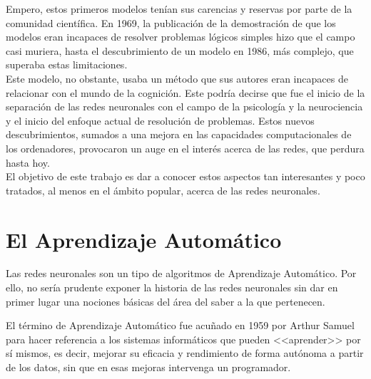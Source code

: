 \documentclass[11pt,twoside,titlepage,a4paper]{article}
\newcommand{\margenimagen}{
\newgeometry{
    left=2.5cm, %
	right=5cm, %
	bottom=2.5cm %
}
}
\numberwithin{equation}{section} %
\theoremstyle{usual}
\begin{document}
Empero, estos primeros modelos tenían sus carencias y reservas por parte
de la comunidad científica. En 1969, la publicación de la demostración de que
los modelos eran incapaces de resolver problemas lógicos simples hizo que el
campo casi muriera, hasta el descubrimiento de un modelo en 1986, más complejo,
que superaba estas limitaciones.\\

Este modelo, no obstante, usaba un método que sus autores eran incapaces de
relacionar con el mundo de la cognición. Este podría decirse que fue el
inicio de la separación de las redes neuronales con el campo de la psicología
y la neurociencia y el inicio del enfoque actual de resolución de problemas.
Estos nuevos descubrimientos, sumados a una mejora en las capacidades
computacionales de los ordenadores, provocaron un auge en el interés acerca de
las redes, que perdura hasta hoy.\\

El objetivo de este trabajo es dar a conocer estos aspectos tan interesantes
y poco tratados, al menos en el ámbito popular, acerca de las redes neuronales.


\newpage
\tableofcontents
\clearpage


\margenimagen
\section{El Aprendizaje Automático}

Las redes neuronales son un tipo de algoritmos de Aprendizaje Automático. Por ello, no sería prudente exponer la historia de las redes neuronales sin dar en primer lugar una nociones básicas del área del saber a la que pertenecen.

El término de Aprendizaje Automático \cite{hisour} fue acuñado en 1959 por Arthur Samuel para hacer referencia a los sistemas informáticos que pueden <<aprender>> por sí mismos, es decir, mejorar su eficacia y rendimiento de forma autónoma a partir de los datos, sin que en esas mejoras intervenga un programador.
\end{document}
